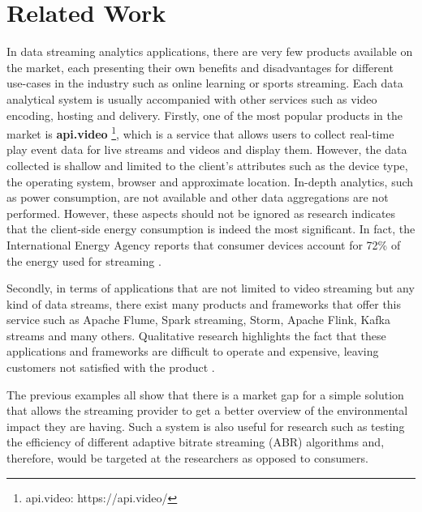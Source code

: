 \label{sec:related_work}

\section{Related Work}
In data streaming analytics applications, there are very few products available on the market, each presenting their own benefits and disadvantages for different use-cases in the industry such as online learning or sports streaming. Each data analytical system is usually accompanied with other services such as video encoding, hosting and delivery. Firstly, one of the most popular products in the market is \textbf{api.video} \footnote{api.video: https://api.video/}, which is a service that allows users to collect real-time play event data for live streams and videos and display them. However, the data collected is shallow and limited to the client's attributes such as the device type, the operating system, browser and approximate location. In-depth analytics, such as power consumption, are not available and other data aggregations are not performed. However, these aspects should not be ignored as research indicates that the client-side energy consumption is indeed the most significant. In fact, the International Energy Agency reports that consumer devices account for 72\% of the energy used for streaming \cite{kamiya2020carbon}. 

Secondly, in terms of applications that are not limited to video streaming but any kind of data streams, there exist many products and frameworks that offer this service such as Apache Flume, Spark streaming, Storm, Apache Flink, Kafka streams and many others. Qualitative research highlights the fact that these applications and frameworks are difficult to operate and expensive, leaving customers not satisfied with the product \cite{chimariya2018streaming}. 

The previous examples all show that there is a market gap for a simple solution that allows the streaming provider to get a better overview of the environmental impact they are having. Such a system is also useful for research such as testing the efficiency of different adaptive bitrate streaming (ABR) algorithms and, therefore, would be targeted at the researchers as opposed to consumers. 
